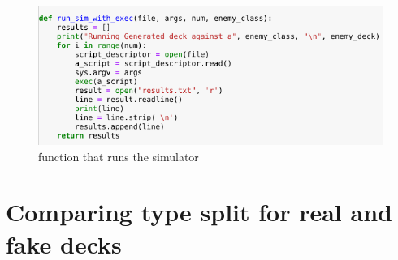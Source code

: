 \documentclass{report} %
\begin{document}
\begin{figure}[H]
\centering
\includegraphics[width=1\textwidth]{simExec}
\caption{function that runs the simulator\protect}
\label{board}
\end{figure}

\section{Comparing type split for real and fake decks}
\end{document}

